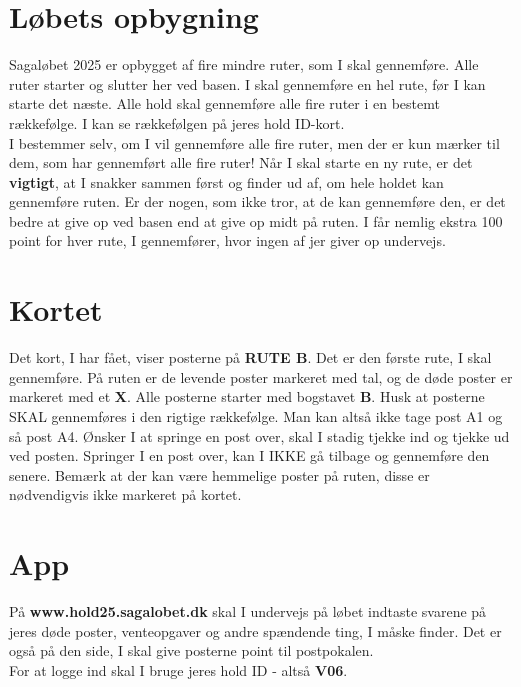 \section{Løbets opbygning}
Sagaløbet 2025 er opbygget af fire mindre ruter, som I skal gennemføre. Alle ruter starter og slutter her ved basen. I skal gennemføre en hel rute, før I kan starte det næste. Alle hold skal gennemføre alle fire ruter i en bestemt rækkefølge. I kan se rækkefølgen på jeres hold ID-kort.\\\newline
I bestemmer selv, om I vil gennemføre alle fire ruter, men der er kun mærker til dem, som har gennemført alle fire ruter! Når I skal starte en ny rute, er det \textbf{vigtigt}, at I snakker sammen først og finder ud af, om hele holdet kan gennemføre ruten. Er der nogen, som ikke tror, at de kan gennemføre den, er det bedre at give op ved basen end at give op midt på ruten. I får nemlig ekstra 100 point for hver rute, I gennemfører, hvor ingen af jer giver op undervejs.\\
\section{Kortet}
Det kort, I har fået, viser posterne på \textbf{RUTE B}. Det er den første rute, I skal gennemføre. På ruten er de levende poster markeret med tal, og de døde poster er markeret med et \textbf{X}. Alle posterne starter med bogstavet \textbf{B}. Husk at posterne SKAL gennemføres i den rigtige rækkefølge. Man kan altså ikke tage post A1 og så post A4. Ønsker I at springe en post over, skal I stadig tjekke ind og tjekke ud ved posten. Springer I en post over, kan I IKKE gå tilbage og gennemføre den senere. Bemærk at der kan være hemmelige poster på ruten, disse er nødvendigvis ikke markeret på kortet.
\section{App}
På \textbf{www.hold25.sagalobet.dk} skal I undervejs på løbet indtaste svarene på jeres døde poster, venteopgaver og andre spændende ting, I måske finder. Det er også på den side, I skal give posterne point til postpokalen.\\
For at logge ind skal I bruge jeres hold ID - altså \textbf{V06}.
\newpage
